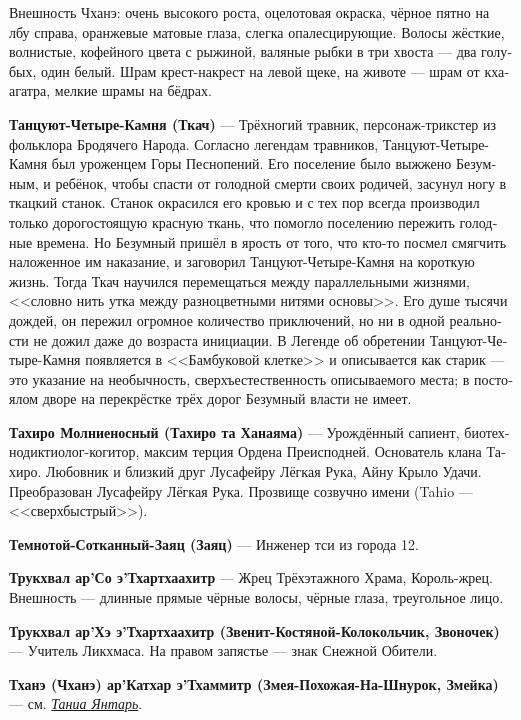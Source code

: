 \documentclass[a4paper,12pt,fleqn]{book}\usepackage{cooltooltips}\usepackage{polyglossia}\setdefaultlanguage[babelshorthands=true]{russian}\setotherlanguage{english}\defaultfontfeatures{Ligatures=TeX,Mapping=tex-text} \usepackage{xcolor}\definecolor{lightgray}{HTML}{bbbbbb}\color{lightgray}\newcommand{\ml}[3]{\textenglish{\textcolor{black}{#3}}}
\newcommand{\theterm}[3]{\textbf{\hypertarget{#1}{#2}} --- #3}
\newcommand{\thesynonim}[3]{\textbf{#2} --- см. \textit{\hyperlink{#1}{#3}}.}
\begin{document}
{{Внешность Чханэ: очень высокого роста, оцелотовая окраска, чёрное пятно на лбу справа, оранжевые матовые глаза, слегка опалесцирующие.
Волосы жёсткие, волнистые, кофейного цвета с рыжиной, валяные рыбки в три хвоста --- два голубых, один белый.
Шрам крест-накрест на левой щеке, на животе --- шрам от кхаагатра, мелкие шрамы на бёдрах.}

\theterm{weaver}
{Танцуют-Четыре-Камня (Ткач)}
{Трёхногий травник, персонаж-трикстер из фольклора Бродячего Народа.
Согласно легендам травников, Танцуют-Четыре-Камня был уроженцем Горы Песнопений.
Его поселение было выжжено Безумным, и ребёнок, чтобы спасти от голодной смерти своих родичей, засунул ногу в ткацкий станок.
Станок окрасился его кровью и с тех пор всегда производил только дорогостоящую красную ткань, что помогло поселению пережить голодные времена.
Но Безумный пришёл в ярость от того, что кто-то посмел смягчить наложенное им наказание, и заговорил Танцуют-Четыре-Камня на короткую жизнь.
Тогда Ткач научился перемещаться между параллельными жизнями, <<словно нить утка между разноцветными нитями основы>>.
Его душе тысячи дождей, он пережил огромное количество приключений, но ни в одной реальности не дожил даже до возраста инициации.
В Легенде об обретении Танцуют-Четыре-Камня появляется в <<Бамбуковой клетке>> и описывается как старик --- это указание на необычность, сверхъестественность описываемого места;
в постоялом дворе на перекрёстке трёх дорог Безумный власти не имеет.}

\theterm{tajiro} %
{Тахиро Молниеносный (Тахиро та Ханаяма)}
{Урождённый сапиент, биотехнодиктиолог-когитор, максим терция Ордена Преисподней.
Основатель клана Тахиро.
Любовник и близкий друг Лусафейру Лёгкая Рука, Айну Крыло Удачи.
Преобразован Лусафейру Лёгкая Рука.
Прозвище созвучно имени (Tahio --- <<сверхбыстрый>>).}

\theterm{hare} %
{Темнотой-Сотканный-Заяц (Заяц)}
{Инженер тси из города 12.}

\theterm{king-priest-trukchual}
{Трукхвал ар’Со э’Тхартхаахитр}
{Жрец Трёхэтажного Храма, Король-жрец.
Внешность --- длинные прямые чёрные волосы, чёрные глаза, треугольное лицо.}

\theterm{teacher-trukchual}
{Трукхвал ар’Хэ э’Тхартхаахитр (Звенит-Костяной-Колокольчик, Звоночек)}
{Учитель Ликхмаса.
На правом запястье --- знак Снежной Обители.}

\thesynonim{chhanei}
{Тханэ (Чханэ) ар’Катхар э’Тхаммитр (Змея-Похожая-На-Шнурок, Змейка)}
{Таниа Янтарь}

}
\end{document}
